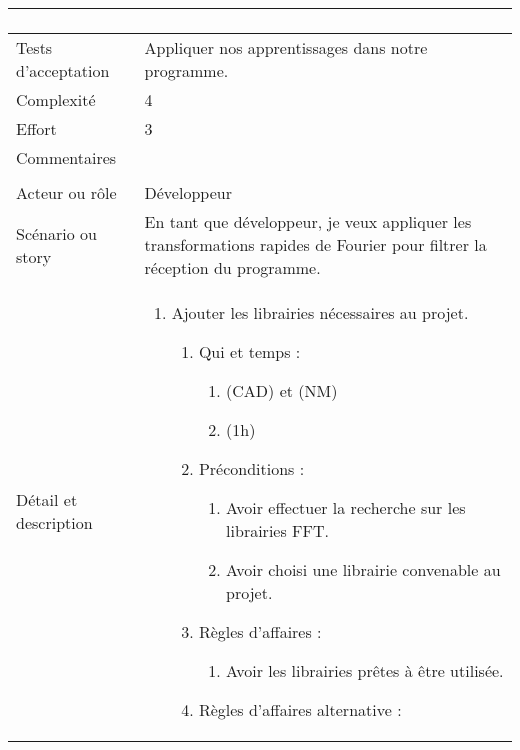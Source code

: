\begin{longtable}{|l|p{}|}
\begin{enumerate}[label*=\arabic*.]
        \end{enumerate} \\
\hline
    Tests d'acceptation & Appliquer nos apprentissages dans notre programme.\\

\hline
    Complexité & 4 \\
\hline
    Effort & 3 \\
\hline
    Commentaires & \\
    
\hline
    \rowcolor{Gray}
    \multicolumn{2}{|l|}{2} \\
\hline
    Acteur ou rôle & Développeur  \\
\hline
    Scénario ou story & En tant que développeur, je veux appliquer les transformations rapides de Fourier pour filtrer la réception du programme.\\
\hline
    Détail et description &
        \begin{enumerate}[label*=\arabic*.]
            \item   Ajouter les librairies nécessaires au projet. 
            \begin{enumerate}[label*=\arabic*.]
                    \item Qui et temps :
                    \begin{enumerate}[label*=\arabic*.]
                        \item (CAD) et (NM)
                        \item (1h)
                    \end{enumerate}
                    \item Préconditions :
                    \begin{enumerate}[label*=\arabic*.]
                        \item Avoir effectuer la recherche sur les librairies FFT.
                        \item Avoir choisi une librairie convenable au projet.
                    \end{enumerate}
                    \item Règles d’affaires :
                    \begin{enumerate}[label*=\arabic*.]
                        \item Avoir les librairies prêtes à être utilisée.
                    \end{enumerate}
                    \item Règles d’affaires alternative :
                    \begin{enumerate}[label*=\arabic*.]

\end{enumerate}
\end{enumerate}
\end{enumerate}
\end{longtable}
